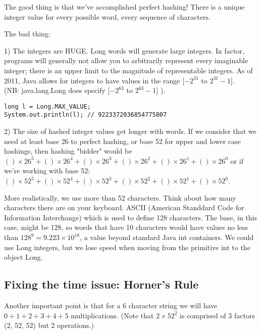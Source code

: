\documentclass[12pt]{article} %
\begin{document}

The good thing is that we've accomplished perfect hashing!  There is a unique integer value for every possible word, every sequence of characters.

The bad thing: 

1) The integers are HUGE.  Long words will generate large integers.  In factor, programs will generally not allow you to arbitrarily represent every imaginable integer; there is an upper limit to the magnitude of representable integers.  As of 2011, Java allows for integers to have  values in the range [$-2^{31}$ to  $2^{31}-1$]. \\


 (NB: java.lang.Long does specify  [$-2^{63}$ to  $2^{63}-1$] ).

\begin{verbatim}
long l = Long.MAX_VALUE;
System.out.println(l); // 9223372036854775807
\end{verbatim}

2)  The size of hashed integer values get longer with words.  If we consider that we need at least base 26 to perfect hashing, or base 52 for upper and lower case hashings, then hashing "bidder" would be $( ) \times 26^5+  ( ) \times 26^4+ ( ) \times 26^3+ ( ) \times 26^2+( ) \times 26^1+ ( ) \times 26^0$  or if we're working with base 52:  $( ) \times 52^5+  ( ) \times 52^4+ ( ) \times 52^3+ ( ) \times 52^2+( ) \times 52^1+ ( ) \times 52^0$. 

More realistically, we use more than 52 characters.  Think about how many characters there are on your keyboard.  ASCII (American Standdard Code for Information Interchange) which is used to define 128 characters.  The base, in this case, might be 128, so words that have 10 characters would have values no less than $128^9 = 9.223 \times 10^{18}$, a value beyond standard Java int containers.  We could use Long integers, but we lose speed when moving from the primitive int to the object Long.

\subsection{Fixing the time issue: Horner's Rule}
Another important point is that for a 6 character string we will have  $0 + 1 + 2 + 3 + 4 + 5$ multiplications.  (Note that $2 \times 52^2$ is comprised of 3 factors (2, 52, 52) but 2 operations.)
\end{document}
